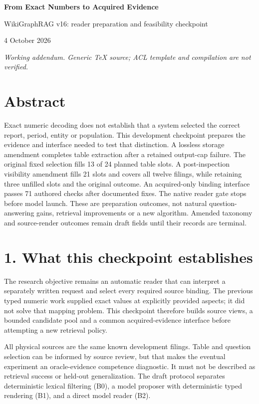 \documentclass[10pt,a4paper]{article}
\begin{document}
\begin{center}{\Large\bfseries From Exact Numbers to Acquired Evidence}\par
WikiGraphRAG v16: reader preparation and feasibility checkpoint\par
4 October 2026\end{center}
\textit{Working addendum. Generic TeX source; ACL template and compilation are not verified.}
\section*{Abstract}
Exact numeric decoding does not establish that a system selected the correct report, period, entity or population. This development checkpoint prepares the evidence and interface needed to test that distinction. A lossless storage amendment completes table extraction after a retained output-cap failure. The original fixed selection fills 13 of 24 planned table slots. A post-inspection visibility amendment fills 21 slots and covers all twelve filings, while retaining three unfilled slots and the original outcome. An acquired-only binding interface passes 71 authored checks after documented fixes. The native reader gate stops before model launch. These are preparation outcomes, not natural question-answering gains, retrieval improvements or a new algorithm. Amended taxonomy and source-render outcomes remain draft fields until their records are terminal.
\section*{1. What this checkpoint establishes}
The research objective remains an automatic reader that can interpret a separately written request and select every required source binding. The previous typed numeric work supplied exact values at explicitly provided aspects; it did not solve that mapping problem. This checkpoint therefore builds source views, a bounded candidate pool and a common acquired-evidence interface before attempting a new retrieval policy.

All physical sources are the same known development filings. Table and question selection can be informed by source review, but that makes the eventual experiment an oracle-evidence competence diagnostic. It must not be described as retrieval success or held-out generalization. The draft protocol separates deterministic lexical filtering (B0), a model proposer with deterministic typed rendering (B1), and a direct model reader (B2).
\end{document}
